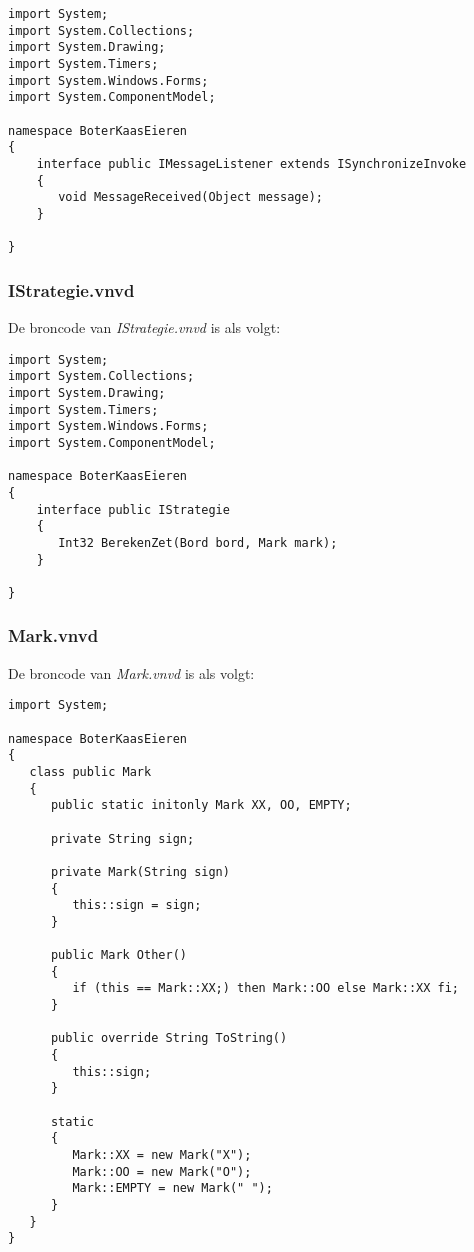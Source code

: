 \begin{lstlisting}
import System;
import System.Collections;
import System.Drawing;
import System.Timers;
import System.Windows.Forms;
import System.ComponentModel;

namespace BoterKaasEieren
{
	interface public IMessageListener extends ISynchronizeInvoke
	{
	   void MessageReceived(Object message);
	}

}
\end{lstlisting}

\subsubsection{IStrategie.vnvd}
De broncode van \textit{IStrategie.vnvd} is als volgt:

\begin{lstlisting}
import System;
import System.Collections;
import System.Drawing;
import System.Timers;
import System.Windows.Forms;
import System.ComponentModel;

namespace BoterKaasEieren
{
	interface public IStrategie
	{
	   Int32 BerekenZet(Bord bord, Mark mark);
	}

}
\end{lstlisting}

\subsubsection{Mark.vnvd}
De broncode van \textit{Mark.vnvd} is als volgt:

\begin{lstlisting}
import System;

namespace BoterKaasEieren
{
   class public Mark
   {
      public static initonly Mark XX, OO, EMPTY;

      private String sign;
      
      private Mark(String sign)
      {
         this::sign = sign;
      }
      
      public Mark Other()
      {
         if (this == Mark::XX;) then Mark::OO else Mark::XX fi;
      }
      
      public override String ToString()
      {
         this::sign;
      }
      
      static
      {
         Mark::XX = new Mark("X");
         Mark::OO = new Mark("O");
         Mark::EMPTY = new Mark(" ");
      }
   }
}
\end{lstlisting}

